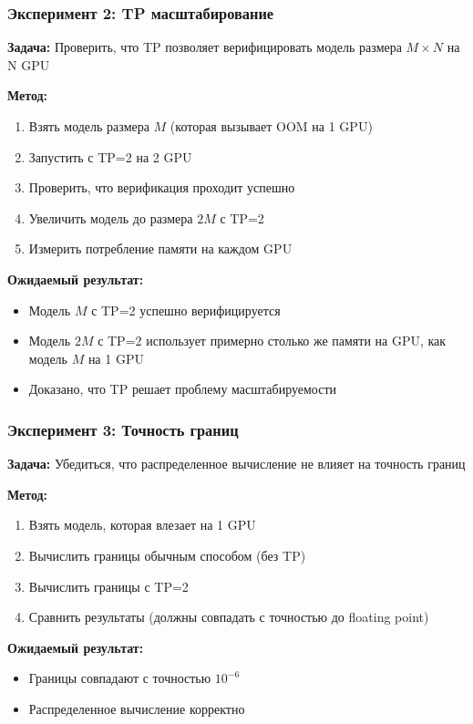 \begin{frame}
\frametitle{Эксперимент 2: TP масштабирование}

\textbf{Задача:} Проверить, что TP позволяет верифицировать модель размера $M \times N$ на N GPU

\vspace{0.3cm}

\textbf{Метод:}
\begin{enumerate}
    \item Взять модель размера $M$ (которая вызывает OOM на 1 GPU)
    \item Запустить с TP=2 на 2 GPU
    \item Проверить, что верификация проходит успешно
    \item Увеличить модель до размера $2M$ с TP=2
    \item Измерить потребление памяти на каждом GPU
\end{enumerate}

\vspace{0.3cm}

\textbf{Ожидаемый результат:}
\begin{itemize}
    \item Модель $M$ с TP=2 успешно верифицируется
    \item Модель $2M$ с TP=2 использует примерно столько же памяти на GPU, как модель $M$ на 1 GPU
    \item Доказано, что TP решает проблему масштабируемости
\end{itemize}

\end{frame}

\begin{frame}
\frametitle{Эксперимент 3: Точность границ}

\textbf{Задача:} Убедиться, что распределенное вычисление не влияет на точность границ

\vspace{0.3cm}

\textbf{Метод:}
\begin{enumerate}
    \item Взять модель, которая влезает на 1 GPU
    \item Вычислить границы обычным способом (без TP)
    \item Вычислить границы с TP=2
    \item Сравнить результаты (должны совпадать с точностью до floating point)
\end{enumerate}

\vspace{0.3cm}

\textbf{Ожидаемый результат:}
\begin{itemize}
    \item Границы совпадают с точностью $10^{-6}$
    \item Распределенное вычисление корректно
\end{itemize}

\end{frame}

